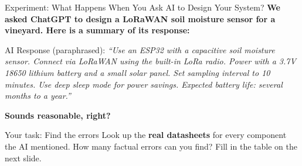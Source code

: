 \documentclass[aspectratio=169,11pt]{beamer}
\begin{document}
\begin{frame}{Experiment: What Happens When You Ask AI to Design Your System?}
    \textbf{We asked ChatGPT to design a LoRaWAN soil moisture sensor for a vineyard. Here is a summary of its response:}
    
    \vspace{0.2cm}
    \begin{block}{AI Response (paraphrased):}
        \textit{``Use an ESP32 with a capacitive soil moisture sensor. Connect via LoRaWAN using the built-in LoRa radio. Power with a 3.7V 18650 lithium battery and a small solar panel. Set sampling interval to 10 minutes. Use deep sleep mode for power savings. Expected battery life: several months to a year.''}
    \end{block}
    
    \vspace{0.3cm}
    \textbf{Sounds reasonable, right?}
    
    \vspace{0.3cm}
    \begin{alertblock}{Your task: Find the errors}
        Look up the \textbf{real datasheets} for every component the AI mentioned. How many factual errors can you find? Fill in the table on the next slide.
    \end{alertblock}
\end{frame}
\end{document}
